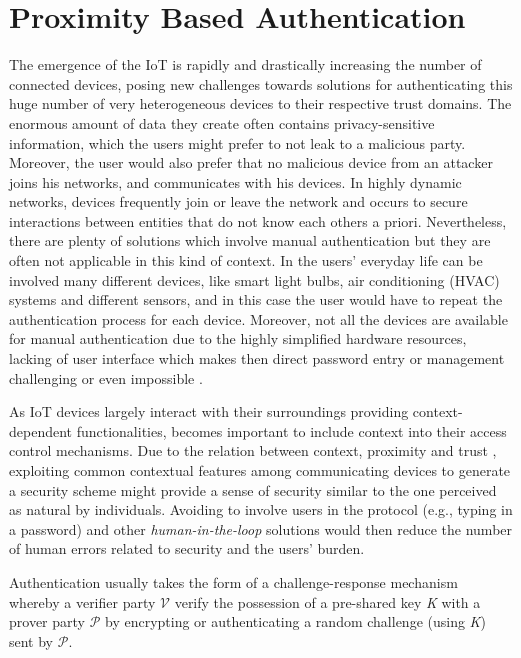 \chapter{Proximity Based Authentication}
\label{proxAuth}
The emergence of the IoT is rapidly and drastically increasing the number of connected devices, posing new challenges towards solutions for authenticating this huge number of very heterogeneous  devices to their respective trust domains.
The enormous amount of data they create often contains privacy-sensitive information, which the users might prefer to not leak to a malicious party.
Moreover, the user would also prefer that no malicious device from an attacker joins his networks, and communicates with his devices.
In highly dynamic networks, devices frequently join or leave the network and occurs to secure interactions between entities that do not know each others a priori. 
Nevertheless, there are plenty of solutions which involve manual authentication but they are often not applicable in this kind of context.
In the users' everyday life can be involved many different devices, like smart light bulbs, air conditioning (HVAC) systems  \cite{Erickson2011OBSERVE:Energy} and different sensors, and in this case the user would have to repeat the authentication process for each device. 
Moreover, not all the devices are available for manual authentication due to the highly simplified hardware resources, lacking of user interface which makes then direct password entry or management  challenging or even impossible \cite{Jewell2015ConnectingInterfaces}.

As \acs{IoT} devices largely interact with their surroundings providing context-dependent functionalities, becomes important to include context into their access control mechanisms.
Due to the relation between context, proximity and trust \cite{Pitelis2013LocalProximity}, exploiting common contextual features among communicating devices to generate a security scheme might provide a sense of security similar to the one perceived as natural by individuals.
Avoiding to involve users in the protocol (e.g., typing in a password) and other \textit{human-in-the-loop} solutions would then reduce the number of human errors related to security and the users' burden.

Authentication usually takes the form of a challenge-response mechanism whereby a verifier party $\mathcal{V}$ verify the possession of a pre-shared key \textit{K}  with a prover party $\mathcal{P}$ by encrypting or authenticating a random challenge (using \textit{K}) sent by $\mathcal{P}$.

